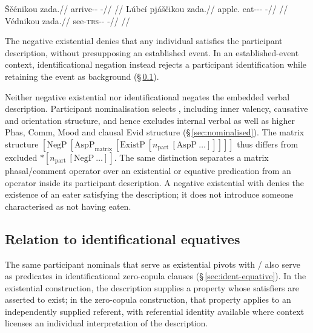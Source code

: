 \pex
\a
\begingl
\gla Ščénikou zada.//
\glb arrive-\Pf{}-\Nmlz{} \NegExst{}-\Cont{}//
\glft {} //
\endgl
\a
\begingl
\gla Lúbcí pjáščikou zada.//
\glb apple.\Ind{} eat-\Antip{}-\Pf{}-\Nmlz{} \NegExst{}-\Cont{}//
\glft {} //
\endgl
\a
\begingl
\gla Védnikou zada.//
\glb see-\textsc{trs}-\Pf{}-\Nmlz{} \NegExst{}-\Cont{}//
\glft {} //
\endgl
\xe

The negative existential denies that any individual satisfies the participant
description, without presupposing an established event. In an established-event
context, identificational negation instead rejects a participant identification
while retaining the event as background (§\,\ref{sec:exst-vs-ident}).

Neither negative existential  nor identificational 
negates the embedded verbal description. Participant nominalisation selects
, including inner valency, causative and orientation
structure, and hence excludes internal verbal  as well as higher
Phas, Comm, Mood and clausal Evid structure (§\,\ref{sec:nominalised}).
The matrix structure $[\mathrm{NegP}\ [\mathrm{AspP}_{\mathrm{matrix}}\ [\mathrm{ExistP}\
[n_{\mathrm{part}}\ [\mathrm{AspP}\ \ldots]]]]]$ thus differs from excluded
$*[n_{\mathrm{part}}\ [\mathrm{NegP}\ \ldots]]$. The same distinction
separates a matrix phasal/comment operator over an existential or equative
predication from an operator inside its participant description. A negative
existential with
 denies the existence of an eater satisfying the description;
it does not introduce someone characterised as not having eaten.

\subsection{Relation to identificational equatives}
\label{sec:exst-vs-ident}

The same participant nominals that serve as existential pivots with
\ird{jec-}/\ird{zad-} also serve as predicates in identificational
zero-copula clauses (§\,\ref{sec:ident-equative}). In the existential
construction, the description supplies a property whose satisfiers are
asserted to exist; in the zero-copula construction, that property applies
to an independently supplied referent, with referential identity available
where context licenses an individual interpretation of the description.

